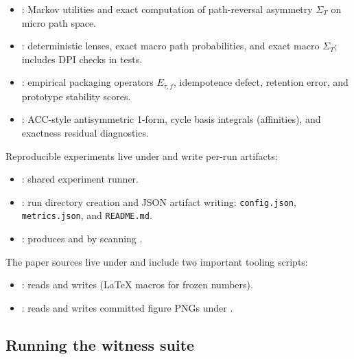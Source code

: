 \documentclass[11pt]{article}
\theoremstyle{definition}
\theoremstyle{remark}
\begin{document}
\begin{itemize}[leftmargin=*, itemsep=0.25em]
  \item {}: Markov utilities and exact computation of path-reversal asymmetry $\Sigma_T$ on micro path space.
  \item {}: deterministic lenses, exact macro path probabilities, and exact macro $\Sigma_T$; includes DPI checks in tests.
  \item {}: empirical packaging operators $E_{\tau,f}$, idempotence defect, retention error, and prototype stability scores.
  \item {}: ACC-style antisymmetric 1-form, cycle basis integrals (affinities), and exactness residual diagnostics.
\end{itemize}

Reproducible experiments live under  and write per-run artifacts:

\begin{itemize}[leftmargin=*, itemsep=0.25em]
  \item {}: shared experiment runner.
  \item {}: run directory creation and JSON artifact writing:
  \texttt{config.json}, \texttt{metrics.json}, and \texttt{README.md}.
  \item {}: produces
   and
  by scanning .
\end{itemize}

The paper sources live under  and include two important tooling scripts:

\begin{itemize}[leftmargin=*, itemsep=0.25em]
  \item {}: reads
  and writes 
  (LaTeX macros for frozen numbers).
  \item {}: reads  and writes committed figure PNGs under .
\end{itemize}

\subsection{Running the witness suite}
\end{document}
